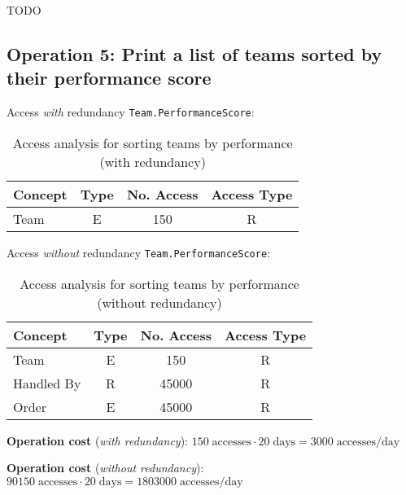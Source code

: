     TODO
    
    \subsection*{Operation 5: Print a list of teams sorted by their performance score}
    
    Access \textit{with} redundancy \texttt{Team.PerformanceScore}:
    
    \begin{table}[h!]
    \centering
    \caption{Access analysis for sorting teams by performance (with redundancy)}
    \begin{tabular}{|l|c|c|c|}
    \hline
    \textbf{Concept} & \textbf{Type} & \textbf{No. Access} & \textbf{Access Type} \\
    \hline
    Team    & E & 150 & R \\
    \hline
    \end{tabular}
    \end{table}
    
    Access \textit{without} redundancy \texttt{Team.PerformanceScore}:
    
    \begin{table}[h!]
    \centering
    \caption{Access analysis for sorting teams by performance (without redundancy)}
    \begin{tabular}{|l|c|c|c|}
    \hline
    \textbf{Concept} & \textbf{Type} & \textbf{No. Access} & \textbf{Access Type} \\
    \hline
    Team       & E & 150    & R \\
    \hline
    Handled By & R & 45000  & R \\
    \hline
    Order      & E & 45000  & R \\
    \hline
    \end{tabular}
    \end{table}
    
    \textbf{Operation cost} (\textit{with redundancy}): $150 \; \text{accesses} \cdot 20 \; \text{days} = 3000 \; \text{accesses/day}$  

    \textbf{Operation cost} (\textit{without redundancy}): $90150 \; \text{accesses} \cdot 20 \; \text{days} = 1803000 \; \text{accesses/day}$
    

